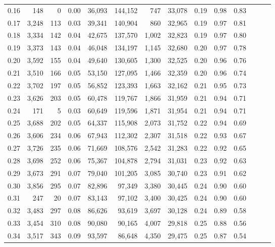 \begin{tabular}{rrrrrrrrrrrrrr}
0.16 &    148 &      0 &  0.00 &   36,093 &  144,152 &     747 &  33,078 &  0.19 &  0.98 &      0.83 \\
0.17 &  3,248 &    113 &  0.03 &   39,341 &  140,904 &     860 &  32,965 &  0.19 &  0.97 &      0.81 \\
0.18 &  3,334 &    142 &  0.04 &   42,675 &  137,570 &   1,002 &  32,823 &  0.19 &  0.97 &      0.80 \\
0.19 &  3,373 &    143 &  0.04 &   46,048 &  134,197 &   1,145 &  32,680 &  0.20 &  0.97 &      0.78 \\
0.20 &  3,592 &    155 &  0.04 &   49,640 &  130,605 &   1,300 &  32,525 &  0.20 &  0.96 &      0.76 \\
0.21 &  3,510 &    166 &  0.05 &   53,150 &  127,095 &   1,466 &  32,359 &  0.20 &  0.96 &      0.74 \\
0.22 &  3,702 &    197 &  0.05 &   56,852 &  123,393 &   1,663 &  32,162 &  0.21 &  0.95 &      0.73 \\
0.23 &  3,626 &    203 &  0.05 &   60,478 &  119,767 &   1,866 &  31,959 &  0.21 &  0.94 &      0.71 \\
0.24 &    171 &      5 &  0.03 &   60,649 &  119,596 &   1,871 &  31,954 &  0.21 &  0.94 &      0.71 \\
0.25 &  3,688 &    202 &  0.05 &   64,337 &  115,908 &   2,073 &  31,752 &  0.22 &  0.94 &      0.69 \\
0.26 &  3,606 &    234 &  0.06 &   67,943 &  112,302 &   2,307 &  31,518 &  0.22 &  0.93 &      0.67 \\
0.27 &  3,726 &    235 &  0.06 &   71,669 &  108,576 &   2,542 &  31,283 &  0.22 &  0.92 &      0.65 \\
0.28 &  3,698 &    252 &  0.06 &   75,367 &  104,878 &   2,794 &  31,031 &  0.23 &  0.92 &      0.63 \\
0.29 &  3,673 &    291 &  0.07 &   79,040 &  101,205 &   3,085 &  30,740 &  0.23 &  0.91 &      0.62 \\
0.30 &  3,856 &    295 &  0.07 &   82,896 &   97,349 &   3,380 &  30,445 &  0.24 &  0.90 &      0.60 \\
0.31 &    247 &     20 &  0.07 &   83,143 &   97,102 &   3,400 &  30,425 &  0.24 &  0.90 &      0.60 \\
0.32 &  3,483 &    297 &  0.08 &   86,626 &   93,619 &   3,697 &  30,128 &  0.24 &  0.89 &      0.58 \\
0.33 &  3,454 &    310 &  0.08 &   90,080 &   90,165 &   4,007 &  29,818 &  0.25 &  0.88 &      0.56 \\
0.34 &  3,517 &    343 &  0.09 &   93,597 &   86,648 &   4,350 &  29,475 &  0.25 &  0.87 &      0.54 \\

\end{tabular}
